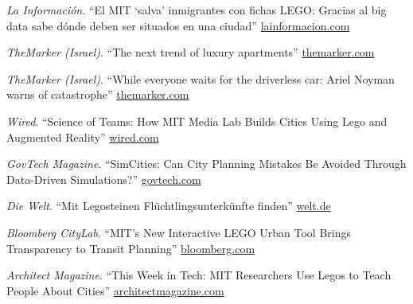 \begin{tablist}
    \item[2018] \tab \textit{La Información}. \enquote{El MIT `salva' inmigrantes con fichas LEGO: Gracias al big data sabe dónde deben ser situados en una ciudad}
    \href{https://www.lainformacion.com/tecnologia/el-mit-salva-inmigrantes-con-fichas-lego-gracias-al-big-data-sabe-donde-deben-ser-situados-en-una-ciudad/6351916/}{lainformacion.com}

    \item[2017] \tab \textit{TheMarker (Israel)}. \enquote{The next trend of luxury apartments}
    \href{https://www.themarker.com/realestate/1.4456551}{themarker.com}

    \item[2017] \tab \textit{TheMarker (Israel)}. \enquote{While everyone waits for the driverless car: Ariel Noyman warns of catastrophe}
    \href{https://www.themarker.com/markerweek/1.4008478}{themarker.com}

    \item[2017] \tab \textit{Wired}. \enquote{Science of Teams: How MIT Media Lab Builds Cities Using Lego and Augmented Reality}
    \href{https://www.wired.com/video/watch/science-of-teams-mit-media-lab}{wired.com}

    \item[2016] \tab \textit{GovTech Magazine}. \enquote{SimCities: Can City Planning Mistakes Be Avoided Through Data-Driven Simulations?}
    \href{https://www.govtech.com/data/SimCities-Can-City-Planning-Mistakes-Be-Avoided-Through-Data-Driven-Simulations.html}{govtech.com}

    \item[2016] \tab \textit{Die Welt}. \enquote{Mit Legosteinen Flüchtlingsunterkünfte finden}
    \href{https://www.welt.de/regionales/hamburg/article152836431/Mit-Legosteinen-Fluechtlingsunterkuenfte-finden.html}{welt.de}

    \item[2015] \tab \textit{Bloomberg CityLab}. \enquote{MIT's New Interactive LEGO Urban Tool Brings Transparency to Transit Planning}
    \href{https://www.bloomberg.com/news/articles/2015-10-16/mit-s-new-interactive-lego-urban-tool-brings-transparency-to-transit-planning}{bloomberg.com}

    \item[2015] \tab \textit{Architect Magazine}. \enquote{This Week in Tech: MIT Researchers Use Legos to Teach People About Cities}
    \href{https://www.architectmagazine.com/technology/this-week-in-tech-mit-researchers-use-legos-to-teach-people-about-cities_o}{architectmagazine.com}


\end{tablist}
